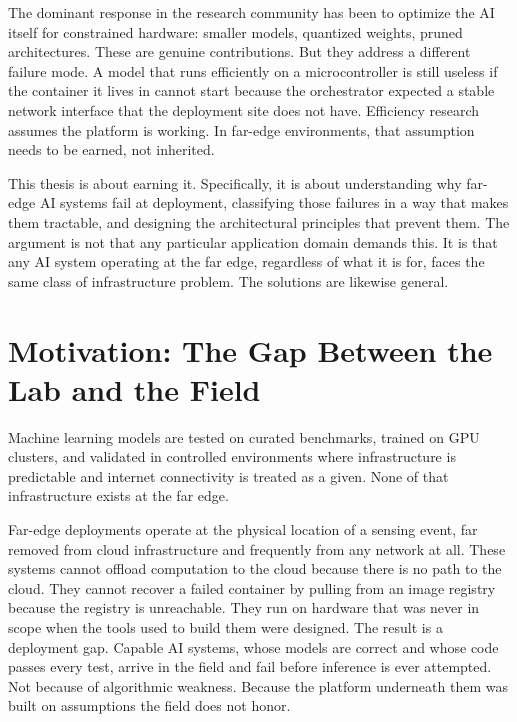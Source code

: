 The dominant response in the research community has been to optimize the AI itself for constrained hardware: smaller models, quantized weights, pruned architectures\cite{deng2020compression, howard2017mobilenets}. These are genuine contributions. But they address a different failure mode. A model that runs efficiently on a microcontroller is still useless if the container it lives in cannot start because the orchestrator expected a stable network interface that the deployment site does not have. Efficiency research \cite{shi2016edge, satyanarayanan2017emergence} assumes the platform is working. In far-edge environments, that assumption needs to be earned, not inherited.
 
This thesis is about earning it. Specifically, it is about understanding why far-edge AI systems fail at deployment, classifying those failures in a way that makes them tractable, and designing the architectural principles that prevent them. The argument is not that any particular application domain demands this. It is that any AI system operating at the far edge, regardless of what it is for, faces the same class of infrastructure problem. The solutions are likewise general.
\section{Motivation: The Gap Between the Lab and the Field}
\label{sec:intro_motivation}
Machine learning models are tested on curated benchmarks, trained on GPU clusters, and validated in controlled environments where infrastructure is predictable and internet connectivity is treated as a given. None of that infrastructure exists at the far edge.

Far-edge deployments operate at the physical location of a sensing event, far removed from cloud infrastructure and frequently from any network at all. These systems cannot offload computation to the cloud because there is no path to the cloud. They cannot recover a failed container by pulling from an image registry because the registry is unreachable. They run on hardware that was never in scope when the tools used to build them were designed.
The result is a deployment gap. Capable AI systems, whose models are correct and whose code passes every test, arrive in the field and fail before inference is ever attempted. Not because of algorithmic weakness. Because the platform underneath them was built on assumptions the field does not honor.

